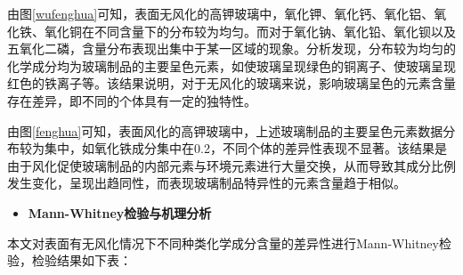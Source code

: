 \documentclass[withoutpreface,bwprint]{cumcmthesis} %
\begin{document}
由图\ref{wufenghua}可知，表面无风化的高钾玻璃中，氧化钾、氧化钙、氧化铝、氧化铁、氧化铜在不同含量下的分布较为均匀。而对于氧化钠、氧化铅、氧化钡以及五氧化二磷，含量分布表现出集中于某一区域的现象。分析发现，分布较为均匀的化学成分均为玻璃制品的主要呈色元素，如使玻璃呈现绿色的铜离子、使玻璃呈现红色的铁离子等。该结果说明，对于无风化的玻璃来说，影响玻璃呈色的元素含量存在差异，即不同的个体具有一定的独特性。

由图\ref{fenghua}可知，表面风化的高钾玻璃中，上述玻璃制品的主要呈色元素数据分布较为集中，如氧化铁成分集中在0.2，不同个体的差异性表现不显著。该结果是由于风化促使玻璃制品的内部元素与环境元素进行大量交换，从而导致其成分比例发生变化，呈现出趋同性，而表现玻璃制品特异性的元素含量趋于相似。

\begin{itemize}
	\item \textbf{Mann-Whitney检验与机理分析}
\end{itemize}

本文对表面有无风化情况下不同种类化学成分含量的差异性进行Mann-Whitney检验，检验结果如下表：
\end{document}
